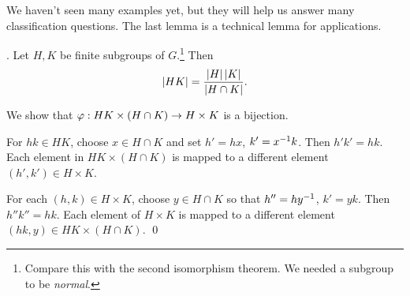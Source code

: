 We haven't seen many examples yet, but they will help us answer many classification questions. The last lemma is a technical lemma for applications.

\lemma. Let \(H, K\) be finite subgroups of \(G\).\footnote{Compare this with the second isomorphism theorem. We needed a subgroup to be \textit{normal}.} Then
\[
    \left| HK \right| = \frac{\left| H \right| \left| K \right|}{\left| H \cap K \right|}.
\]

\pf We show that \(\varphi : HK \times (H \cap K) \rightarrow H \times K\) is a bijection.

\note{\(\leq\)} For \(hk \in HK\), choose \(x \in H \cap K\) and set \(h' = hx\), \(k' = x^{-1} k\). Then \(h'k' = hk\). Each element in \(HK \times (H \cap K)\) is mapped to a different element \((h', k') \in H \times K\).

\note{\(\geq\)} For each \((h, k) \in H \times K\), choose \(y \in H\cap K\) so that \(h'' = hy^{-1}\), \(k' = yk\). Then \(h''k'' = hk\). Each element of \(H \times K\) is mapped to a different element \((hk, y) \in HK \times (H \cap K)\). \qed
